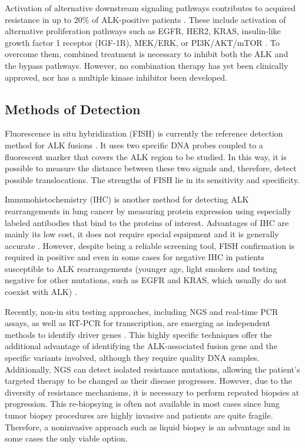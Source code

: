 Activation of alternative downstream signaling pathways contributes to acquired resistance in up to 20\% of ALK-positive patients \cite{TKI_acquired, Bypass}. These include activation of alternative proliferation pathways such as EGFR, HER2, KRAS, insulin-like growth factor 1 receptor (IGF-1R), MEK\slash ERK, or PI3K\slash AKT\slash mTOR \cite{ALK_resistance}. To overcome them, combined treatment is necessary to inhibit both the ALK and the bypass pathways. However, no combination therapy has yet been clinically approved, nor has a multiple kinase inhibitor been developed.

\subsection{Methods of Detection}

Fluorescence in situ hybridization (FISH) is currently the reference detection method for ALK fusions \cite{EML4_ALK_variants}. It uses two specific DNA probes coupled to a fluorescent marker that covers the ALK region to be studied. In this way, it is possible to measure the distance between these two signals and, therefore, detect possible translocations. The strengths of FISH lie in its sensitivity and specificity.

Immunohistochemistry (IHC) is another method for detecting ALK rearrangements in lung cancer by measuring protein expression using especially labeled antibodies that bind to the proteins of interest. Advantages of IHC are mainly its low cost, it does not require special equipment and it is generally accurate \cite{ALK_inhibitors}. However, despite being a reliable screening tool, FISH confirmation is required in positive and even in some cases for negative IHC in patients susceptible to ALK rearrangements (younger age, light smokers and testing negative for other mutations, such as EGFR and KRAS, which usually do not coexist with ALK) \cite{FISH_IHC}.

Recently, non-in situ testing approaches, including NGS and real-time PCR assays, as well as RT-PCR for transcription, are emerging as independent methods to identify driver genes \cite{EML4_ALK_variants}. This highly specific techniques offer the additional advantage of identifying the ALK-associated fusion gene and the specific variants involved, although they require quality DNA samples. Additionally, NGS can detect isolated resistance mutations, allowing the patient's targeted therapy to be changed as their disease progresses. However, due to the diversity of resistance mechanisms, it is necessary to perform repeated biopsies at progression. This re-biopsying is often not available in most cases since lung tumor biopsy procedures are highly invasive and patients are quite fragile. Therefore, a noninvasive approach such as liquid biopsy is an advantage and in some cases the only viable option.

